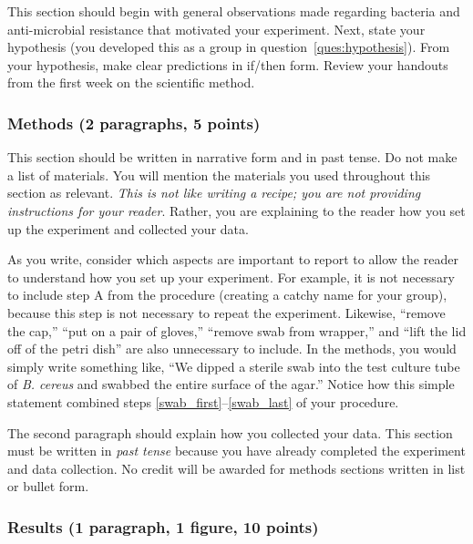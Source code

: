 \documentclass[12pt]{exam}
\begin{document}
This section should begin with general observations made regarding
bacteria and anti-microbial resistance that motivated your experiment.
Next, state your hypothesis (you developed this as a group in question~\ref{ques:hypothesis}).
From your hypothesis, make clear predictions in if/then form. Review your handouts from
the first week on the scientific method.

\subsubsection*{Methods (2 paragraphs, 5 points)} 

This section should be written in narrative form and in past tense. Do
not make a list of materials. You will mention the materials you used
throughout this section as relevant. \emph{This is not like writing a
recipe; you are not providing instructions for your reader}. Rather, you
are explaining to the reader how you set up the experiment and collected
your data.

As you write, consider which aspects are important to report to allow
the reader to understand how you set up your experiment. For example, it
is not necessary to include step A from the procedure (creating a catchy
name for your group), because this step is not necessary to repeat the
experiment. Likewise, ``remove the cap,'' ``put on a pair of
gloves,'' ``remove swab from wrapper,'' and ``lift the lid off of the petri
dish'' are also unnecessary to include. In the methods, you would simply
write something like, ``We dipped a sterile swab into the test culture
tube of \emph{B. cereus} and swabbed the entire surface of the agar.''
Notice how this simple statement combined steps \ref{swab_first}–\ref{swab_last} of your procedure.

The second paragraph should explain how you
collected your data. This section must be written in \emph{past tense} because you have
already completed the experiment and data collection. No credit will be
awarded for methods sections written in list or bullet form.

\subsubsection*{Results (1 paragraph, 1 figure, 10 points)}

\end{document}
